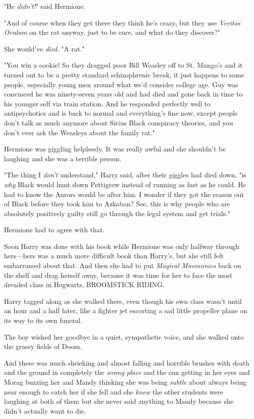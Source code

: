 "He \emph{didn't!}" said Hermione.

"And of course when they get there they think he's crazy, but they use
\emph{Veritas Oculum} on the rat anyway, just to be sure, and what do they
discover?"

She would've \emph{died}. "A rat."

"You win a cookie! So they dragged poor Bill Weasley off to St. Mungo's and it
turned out to be a pretty standard schizophrenic break, it just happens to some
people, especially young men around what we'd consider college age. Guy was
convinced he was ninety-seven years old and had died and gone back in time to
his younger self via train station. And he responded perfectly well to
antipsychotics and is back to normal and everything's fine now, except people
don't talk as much anymore about Sirius Black conspiracy theories, and you
don't ever ask the Weasleys about the family rat."

Hermione was giggling helplessly. It was really awful and she shouldn't be
laughing and she was a terrible person.

"The thing I \emph{don't} understand," Harry said, after their giggles had died
down, "is \emph{why} Black would hunt down Pettigrew instead of running as fast
as he could. He had to know the Aurors would be after him. I wonder if they got
the reason out of Black before they took him to Azkaban? See, this is why
people who are absolutely positively guilty still go through the legal system
and get trials."

Hermione had to agree with that.

Soon Harry was done with his book while Hermione was only halfway through
hers—hers was a much more difficult book than Harry's, but she still felt
embarrassed about that. And then she had to put \emph{Magical Mnemonics} back
on the shelf and drag herself away, because it was time for her to face the
most dreaded class in Hogwarts, BROOMSTICK RIDING.

Harry tagged along as she walked there, even though his own class wasn't until
an hour and a half later, like a fighter jet escorting a sad little propeller
plane on its way to its own funeral.

The boy wished her goodbye in a quiet, sympathetic voice, and she walked onto
the grassy fields of Doom.

And there was much shrieking and almost falling and horrible brushes with death
and the ground in completely the \emph{wrong place} and the sun getting in her
eyes and Morag buzzing her and Mandy thinking she was being \emph{subtle} about
always being near enough to catch her if she fell and she \emph{knew} the other
students were laughing at both of them but she never said anything to Mandy
because she didn't actually want to die.

